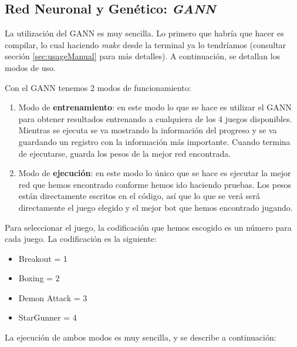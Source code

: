 \newpage
\subsection{Red Neuronal y Genético: \textit{GANN}}

La utilización del GANN es muy sencilla. Lo primero que habría que hacer es compilar, lo cual haciendo \textit{make} desde la terminal ya lo tendríamos (consultar sección \ref{sec:usageManual} para más detalles). A continuación, se detallan los modos de uso.

Con el GANN tenemos 2 modos de funcionamiento:

\begin{enumerate}
    \item Modo de \textbf{entrenamiento}: en este modo lo que se hace es utilizar el GANN para obtener resultados entrenando a cualquiera de los 4 juegos disponibles. Mientras se ejecuta se va mostrando la información del progreso y se va guardando un registro con la información más importante. Cuando termina de ejecutarse, guarda los pesos de la mejor red encontrada.
    \item Modo de \textbf{ejecución}: en este modo lo único que se hace es ejecutar la mejor red que hemos encontrado conforme hemos ido haciendo pruebas. Los pesos están directamente escritos en el código, así que lo que se verá será directamente el juego elegido y el mejor bot que hemos encontrado jugando.
\end{enumerate}

Para seleccionar el juego, la codificación que hemos escogido es un número para cada juego. La codificación es la siguiente:

\begin{itemize}
    \item Breakout = 1
    \item Boxing = 2
    \item Demon Attack = 3
    \item StarGunner = 4
\end{itemize}

La ejecución de ambos modos es muy sencilla, y se describe a continuación:

